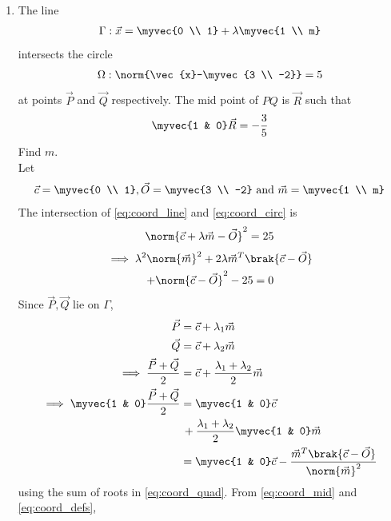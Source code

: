\begin{enumerate}[label=\arabic*.,ref=\thesubsection.\theenumi]
\item The line 
\begin{align}
\Gamma: \vec{x} = \myvec{0 \\ 1} + \lambda \myvec{1 \\ m}
\label{eq:coord_line}
\end{align}
intersects the circle
\begin{align}
\Omega: \norm{\vec{x}-\myvec{3 \\ -2}} = 5
\label{eq:coord_circ}
\end{align}
at points $\vec{P}$ and $\vec{Q}$ respectively. The mid point of $PQ$ is 
$\vec{R}$ such that
\begin{align}
\myvec{1 & 0}\vec{R} = -\frac{3}{5}
\label{eq:coord_mid}
\end{align}
%
Find $m$.
\\
\solution Let 
\begin{align}
\vec{c} = \myvec{0 \\ 1}, \vec{O} = \myvec{3 \\ -2} \text{ and } \vec{m} = 
\myvec{1 \\ m}
\label{eq:coord_defs}
\end{align}
%
The intersection of  \eqref{eq:coord_line} and \eqref{eq:coord_circ} is 
\begin{align}
\norm{\vec{c}+\lambda\vec{m} -\vec{O}}^2 = 25
\end{align}
\begin{multline}
\label{eq:coord_quad}
\implies \lambda^2 \norm{\vec{m}}^2+ 2\lambda\vec{m}^{T}\brak{\vec{c} 
-\vec{O}}
\\
+\norm{\vec{c} -\vec{O}}^2-25 = 0
\end{multline}
%
Since $\vec{P}, \vec{Q}$ lie on $\Gamma$,
\begin{align}
\vec{P} &= \vec{c}+\lambda_1\vec{m} 
\\
\vec{Q} &= \vec{c}+\lambda_2\vec{m} 
\\
\implies \frac{\vec{P}+\vec{Q}}{2} &= \vec{c} + 
\frac{\lambda_1+\lambda_2}{2}\vec{m} 
\\
\implies \myvec{1 & 0}\frac{\vec{P}+\vec{Q}}{2} &= \myvec{1 & 0}\vec{c}
\nonumber \\
& \,+ \frac{\lambda_1+\lambda_2}{2}\myvec{1 & 0}\vec{m} 
\\
&= \myvec{1 & 0}\vec{c} -
\frac{\vec{m}^{T}\brak{\vec{c} -\vec{O}}}{\norm{\vec{m}}^2}
\end{align}
using the sum of roots in \eqref{eq:coord_quad}.  From 
\eqref{eq:coord_mid} and \eqref{eq:coord_defs},
\begin{align}

\end{align}
\end{enumerate}
